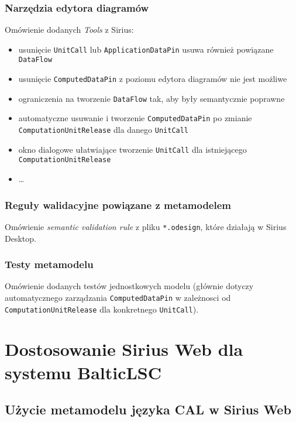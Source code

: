 \subsection{Narzędzia edytora diagramów}

Omówienie dodanych \textit{Tools} z Sirius:

\begin{itemize}
	\item usunięcie \texttt{UnitCall} lub \texttt{ApplicationDataPin} usuwa również powiązane \texttt{DataFlow}
	\item usunięcie \texttt{ComputedDataPin} z poziomu edytora diagramów nie jest możliwe
	\item ograniczenia na tworzenie \texttt{DataFlow} tak, aby były semantycznie poprawne
	\item automatyczne usuwanie i tworzenie \texttt{ComputedDataPin} po zmianie \texttt{ComputationUnitRelease} dla danego \texttt{UnitCall}
	\item okno dialogowe ułatwiające tworzenie \texttt{UnitCall} dla istniejącego \texttt{ComputationUnitRelease}
	\item \ldots
\end{itemize}

\subsection{Reguły walidacyjne powiązane z
	metamodelem}\label{sec:regulky-walidacyjne-metamodel}

Omówienie \textit{semantic validation rule} z pliku \texttt{*.odesign}, które
działają w Sirius Desktop.

\subsection{Testy metamodelu}

Omówienie dodanych testów jednostkowych modelu (głównie dotyczy automatycznego
zarządzania \texttt{ComputedDataPin} w zależnosci od
\texttt{ComputationUnitRelease} dla konkretnego \texttt{UnitCall}).

\chapter{Dostosowanie Sirius Web dla systemu BalticLSC}

\section{Użycie metamodelu języka CAL w Sirius Web}

